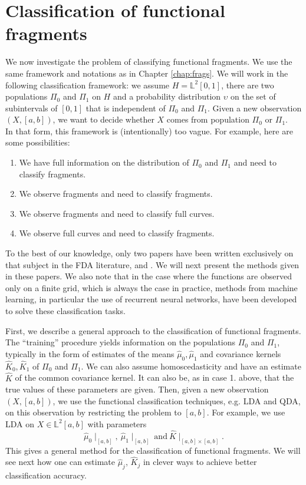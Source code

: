\documentclass[10pt, a4paper]{report}
\newcommand{\Ll}[0]{\mathbb{L}}
\theoremstyle{definition}
\theoremstyle{remark}
\begin{document}
\section{Classification of functional fragments}
We now investigate the problem of classifying functional fragments. We use the same framework and notations as in Chapter \ref{chap:frags}. We will work in the following classification framework: we assume $H=\Ll^2[0,1]$, there are two populations $\Pi_0$ and $\Pi_1$ on $H$ and a probability distribution $\upsilon$ on the set of subintervals of $[0,1]$ that is independent of $\Pi_0$ and $\Pi_1$. Given a new observation $(X,[a,b])$, we want to decide whether $X$ comes from population $\Pi_0$ or $\Pi_1$.\\
In that form, this framework is (intentionally) too vague. For example, here are some possibilities:
\begin{enumerate}
	\item We have full information on the distribution of $\Pi_0$ and $\Pi_1$ and need to classify fragments.
	\item We observe fragments and need to classify fragments.
	\item We observe fragments and need to classify full curves.
	\item We observe full curves and need to classify fragments.
\end{enumerate}
To the best of our knowledge, only two papers have been written exclusively on that subject in the FDA literature, \cite{DH1} and \cite{Kraus2}. We will next present the methods given in these papers. We also note that in the case where the functions are observed only on a finite grid, which is always the case in practice, methods from machine learning, in particular the use of recurrent neural networks, have been developed to solve these classification tasks. 

First, we describe a general approach to the classification of functional fragments. The ``training'' procedure yields information on the populations $\Pi_0$ and $\Pi_1$, typically in the form of estimates of the means $\hat{\mu}_0,\hat{\mu}_1$ and covariance kernels $\hat{K}_0,\hat{K}_1$ of $\Pi_0$ and $\Pi_1$. We can also assume homoscedasticity and have an estimate $\hat{K}$ of the common covariance kernel. It can also be, as in case 1. above, that the true values of these parameters are given. Then, given a new observation $(X,[a,b])$, we use the functional classification techniques, e.g. LDA and QDA, on this observation by restricting the problem to $[a,b]$. For example, we use LDA on $X\in \Ll^2[a,b]$ with parameters
$$\hat{\mu}_0\!\mid_{[a,b]}, \ \hat{\mu}_1\!\mid_{[a,b]} \ \text{and} \ \hat{K}\!\mid_{[a,b]\times[a,b]}.$$
This gives a general method for the classification of functional fragments. We will see next how one can estimate $\hat{\mu}_j$, $\hat{K}_j$ in clever ways to achieve better classification accuracy.
\end{document}
